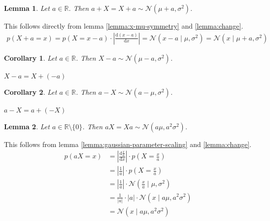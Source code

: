 \documentclass[11pt,a4paper]{book}
\newtheorem{lemma}{Lemma}
\newtheorem*{corollary}{Corollary}
\begin{document}
\begin{lemma}
  Let $a \in \mathbb{R}$. Then
  $a + X = X + a \sim \mathcal{N}(\mu + a, \sigma^{2})$.
\end{lemma}
\begin{proof2}
  This follows directly from lemma \ref{lemma:x-mu-symmetry} and
  \ref{lemma:change}.
  \begin{align*}
    p(X + a = x) = p(X = x - a) \cdot \left| \frac{\mathrm{d}(x - a)}{\mathrm{d}x} \right| = \mathcal{N}(x - a \mid \mu, \sigma^{2}) = \mathcal{N}(x \mid \mu + a, \sigma^{2})
  \end{align*}
\end{proof2}

\begin{corollary}
  Let $a \in \mathbb{R}$. Then $X - a \sim \mathcal{N}(\mu - a, \sigma^{2})$.
\end{corollary}
\begin{proof2}
  $X - a = X + (-a)$
\end{proof2}

\begin{corollary}
  Let $a \in \mathbb{R}$. Then $a - X \sim \mathcal{N}(a - \mu, \sigma^{2})$.
\end{corollary}
\begin{proof2}
  $a - X = a + (-X)$
\end{proof2}

\begin{lemma}
  Let $a \in \mathbb{R} \setminus \{ 0 \}$. Then
  $aX = Xa \sim \mathcal{N}(a\mu, a^{2}\sigma^{2})$.
\end{lemma}
\begin{proof2}
  This follows from lemma \ref{lemma:gaussian-parameter-scaling} and
  \ref{lemma:change}.
  \begin{align*}
    p(aX = x) & = \left| \frac{\mathrm{d}\frac{x}{a}}{\mathrm{d}x} \right| \cdot p\left( X = \frac{x}{a} \right)\\
              & = \left|\frac{1}{a}\right| \cdot p\left( X = \frac{x}{a} \right)\\
              & = \left|\frac{1}{a}\right| \cdot \mathcal{N}\left(\frac{x}{a} \mid \mu, \sigma^{2}\right)\\
              & = \frac{1}{|a|} \cdot |a| \cdot \mathcal{N}\left(x \mid a\mu, a^{2}\sigma^{2}\right)\\
              & = \mathcal{N}\left(x \mid a\mu, a^{2}\sigma^{2}\right)
  \end{align*}
\end{proof2}
\end{document}
